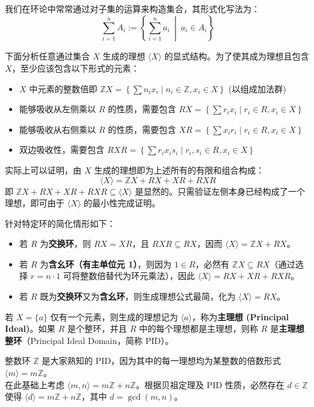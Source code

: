 \documentclass[11pt]{article}
\begin{document}
我们在环论中常常通过对子集的运算来构造集合，其形式化写法为： 
$$ \sum_{i=1}^{n} A_i := \left\{ \sum_{i=1}^{n} a_i \ \middle|\ a_i \in A_i \right\} $$

下面分析任意通过集合 $X$ 生成的理想 $\langle X \rangle$ 的显式结构。为了使其成为理想且包含 $X$，至少应该包含以下形式的元素：
\begin{itemize}
    \item $X$ 中元素的整数倍即 $\mathbb{Z}X = \left\{ \sum n_i x_i \mid n_i \in \mathbb{Z}, x_i \in X \right\}$ (以组成加法群)
    \item 能够吸收从左侧乘以 $R$ 的性质，需要包含 $RX = \left\{ \sum r_i x_i \mid r_i \in R, x_i \in X \right\}$
    \item 能够吸收从右侧乘以 $R$ 的性质，需要包含 $XR = \left\{ \sum x_i r_i \mid r_i \in R, x_i \in X \right\}$
    \item 双边吸收性，需要包含 $RXR = \left\{ \sum r_i x_i s_i \mid r_i, s_i \in R, x_i \in X \right\}$
\end{itemize}

实际上可以证明，由 $X$ 生成的理想即为上述所有的有限和组合构成：
$$ \langle X \rangle = \mathbb{Z}X + RX + XR + RXR $$
即 $\mathbb{Z}X + RX + XR + RXR \subseteq \langle X \rangle$ 是显然的。只需验证左侧本身已经构成了一个理想，即可由于 $\langle X \rangle$ 的最小性完成证明。

针对特定环的简化情形如下：
\begin{itemize}
    \item 若 $R$ 为\textbf{交换环}，则 $RX=XR$，且 $RXR \subseteq RX$，因而 $\langle X \rangle = \mathbb{Z}X + RX$。
    \item 若 $R$ 为\textbf{含幺环（有主单位元 1）}，则因为 $1 \in R$，必然有 $\mathbb{Z}X \subseteq RX$（通过选择 $r = n \cdot 1$ 可将整数倍替代为环元乘法），因此 $\langle X \rangle = RX + XR + RXR$。
    \item 若 $R$ 既为\textbf{交换环}又为\textbf{含幺环}，则生成理想公式最简，化为 $\langle X \rangle = RX$。
\end{itemize}

\begin{cndefinition}
若 $X = \{a\}$ 仅有一个元素，则生成的理想记为 $\langle a \rangle$，称为\textbf{主理想 (Principal Ideal)}。如果 $R$ 是个整环，并且 $R$ 中的每个理想都是主理想，则称 $R$ 是\textbf{主理想整环}（Principal Ideal Domain，简称 PID）。
\end{cndefinition}

\begin{cnexample}
整数环 $\mathbb{Z}$ 是大家熟知的 PID，因为其中的每一理想均为某整数的倍数形式 $\langle m \rangle = m\mathbb{Z}$。\\
在此基础上考虑 $\langle m, n \rangle = m\mathbb{Z} + n\mathbb{Z}$。根据贝祖定理及 PID 性质，必然存在 $d \in \mathbb{Z}$ 使得 $\langle d \rangle = m\mathbb{Z} + n\mathbb{Z}$，其中 $d = \gcd(m, n)$。
\end{cnexample}
\end{document}

